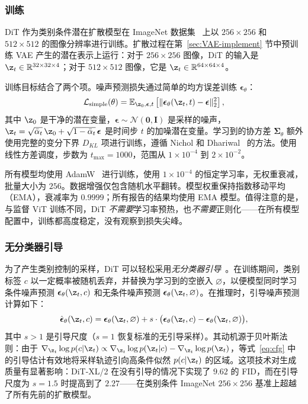 \documentclass[../../book-main_zh.tex]{subfiles}
\begin{document}
\subsubsection{训练}
DiT 作为类别条件潜在扩散模型在 ImageNet 数据集~\citep{deng2009imagenet} 上以 $256 \times 256$ 和 $512 \times 512$ 的图像分辨率进行训练。扩散过程在第~\ref{sec:VAE-implement} 节中预训练 VAE 产生的潜在表示上运行：对于 $256 \times 256$ 图像，DiT 的输入是 $\z_t \in \mathbb{R}^{32 \times 32 \times 4}$；对于 $512 \times 512$ 图像，它是 $\z_t \in \mathbb{R}^{64 \times 64 \times 4}$。

训练目标结合了两个项。噪声预测损失通过简单的均方误差训练 $\boldsymbol{\epsilon}_\theta$：
\begin{equation}
    \mathcal{L}_{\mathrm{simple}}(\theta) = \mathbb{E}_{\z_0, \boldsymbol{\epsilon}, t}\left[\|\boldsymbol{\epsilon}_\theta(\z_t, t) - \boldsymbol{\epsilon}\|_2^2\right],
\end{equation}
其中 $\z_0$ 是干净的潜在变量，$\boldsymbol{\epsilon} \sim \mathcal{N}(\boldsymbol{0}, \boldsymbol{I})$ 是采样的噪声，$\z_t = \sqrt{\bar{\alpha}_t}\,\z_0 + \sqrt{1 - \bar{\alpha}_t}\,\boldsymbol{\epsilon}$ 是时间步 $t$ 的加噪潜在变量。学习到的协方差 $\boldsymbol{\Sigma}_\theta$ 额外使用完整的变分下界 $D_{KL}$ 项进行训练，遵循 Nichol 和 Dhariwal~\citep{nichol2021improved} 的方法。使用线性方差调度，步数为 $t_{\max} = 1000$，范围从 $1 \times 10^{-4}$ 到 $2 \times 10^{-2}$。

所有模型均使用 AdamW~\citep{loshchilov2019decoupled} 进行训练，使用 $1 \times 10^{-4}$ 的恒定学习率，无权重衰减，批量大小为 $256$。数据增强仅包含随机水平翻转。模型权重保持指数移动平均（EMA），衰减率为 $0.9999$；所有报告的结果均使用 EMA 模型。值得注意的是，与监督 ViT 训练不同，DiT \emph{不需要}学习率预热，也\emph{不需要}正则化——在所有模型配置中，训练都高度稳定，没有观察到损失尖峰。

\subsubsection{无分类器引导}
为了产生类别控制的采样，DiT 可以轻松采用\emph{无分类器引导}~\citep{ho2022classifier}。在训练期间，类别标签 $c$ 以一定概率被随机丢弃，并替换为学习到的空嵌入 $\varnothing$，以便模型同时学习条件噪声预测 $\boldsymbol{\epsilon}_\theta(\z_t, c)$ 和无条件噪声预测 $\boldsymbol{\epsilon}_\theta(\z_t, \varnothing)$。在推理时，引导噪声预测计算如下：
\begin{equation}
    \hat{\boldsymbol{\epsilon}}_\theta(\z_t, c) = \boldsymbol{\epsilon}_\theta(\z_t, \varnothing) + s \cdot \big(\boldsymbol{\epsilon}_\theta(\z_t, c) - \boldsymbol{\epsilon}_\theta(\z_t, \varnothing)\big),
    \label{eq:cfg}
\end{equation}
其中 $s > 1$ 是引导尺度（$s = 1$ 恢复标准的无引导采样）。其动机源于贝叶斯法则：由于 $\nabla_{\z_t} \log p(c | \z_t) \propto \nabla_{\z_t} \log p(\z_t | c) - \nabla_{\z_t} \log p(\z_t)$，等式~\eqref{eq:cfg} 中的引导估计有效地将采样轨迹引向高条件似然 $p(c | \z_t)$ 的区域。这项技术对生成质量有显著影响：DiT-XL/2 在没有引导的情况下实现了 $9.62$ 的 FID，而在引导尺度为 $s = 1.5$ 时提高到了 $2.27$——在类别条件 ImageNet $256 \times 256$ 基准上超越了所有先前的扩散模型。
\end{document}
